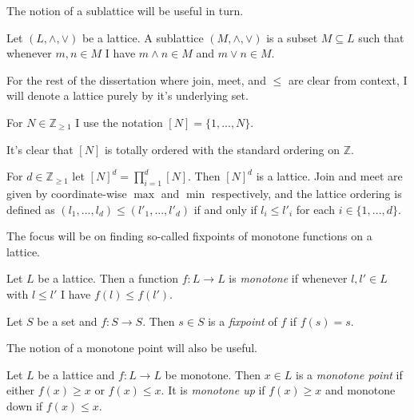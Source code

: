 The notion of a sublattice will be useful in turn.
\begin{definition}[Sublattice]
  Let $(L, \wedge, \vee)$ be a lattice. A sublattice $(M, \wedge, \vee)$ is a
  subset $M \subseteq L$ such that whenever $m, n \in M$ I have $m \wedge n \in M$ and
  $m \vee n \in M$.
\end{definition}
For the rest of the dissertation where join, meet, and $\leq$ are clear from context, I will denote a lattice purely by it's underlying set.
\begin{notation}
  For $N \in \mathbb{Z}_{\geq 1}$ I use the notation $[N] = \{1, ..., N\}$.
\end{notation}
It's clear that $[N]$ is totally ordered with the standard ordering on $\mathbb{Z}$.
\begin{cor}
  For $d \in \mathbb{Z}_{\geq 1}$ let $[N]^d = \prod_{i=1}^d [N]$. Then $[N]^d$ is a lattice. Join and meet
  are given by coordinate-wise $\max$ and $\min$ respectively, and the lattice ordering is defined as $(l_1, ..., l_d) \leq (l'_1, ..., l'_d)$
  if and only if $l_i \leq l'_i$ for each $i \in \{1, ..., d\}$.
\end{cor}
The focus will be on finding so-called fixpoints of monotone functions on a lattice.
\begin{definition}
  Let $L$ be a lattice. Then a function $f : L \to L$ is \emph{monotone} if whenever $l, l' \in L$ with
  $l \leq l'$ I have $f(l) \leq f(l')$.
\end{definition}
\begin{definition}[Fixpoint]
  Let $S$ be a set and $f : S \to S$. Then $s \in S$ is a \emph{fixpoint} of $f$ if $f(s) = s$.
\end{definition}
The notion of a monotone point will also be useful.
\begin{definition}
  Let $L$ be a lattice and $f : L \to L$ be monotone. Then $x \in L$ is a \emph{monotone point}
  if either $f(x) \geq x$ or $f(x) \leq x$. It is \emph{monotone up} if $f(x) \geq x$ and monotone
  down if $f(x) \leq x$.
\end{definition}

